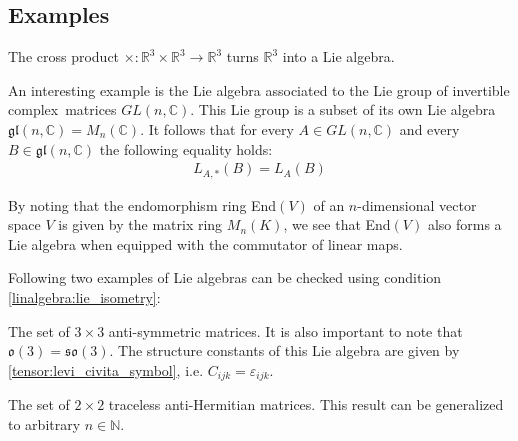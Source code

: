 \subsection{Examples}

        \begin{example}
        	The cross product $\times:\mathbb{R}^3\times\mathbb{R}^3\rightarrow\mathbb{R}^3$ turns $\mathbb{R}^3$ into a Lie algebra.
        \end{example}
        \begin{example}
        	An interesting example is the Lie algebra associated to the Lie group of invertible complex\footnotemark\ matrices $GL(n, \mathbb{C})$. This Lie group is a subset of its own Lie algebra $\mathfrak{gl}(n, \mathbb{C}) = M_n(\mathbb{C})$. It follows that for every $A\in GL(n, \mathbb{C})$ and every $B\in\mathfrak{gl}(n, \mathbb{C})$ the following equality holds:
        	\begin{gather}
        		L_{A,\ast}(B) = L_A(B)
        	\end{gather}
        \end{example}
        \begin{result}\label{lie:end_as_lie_algebra}
        	By noting that the endomorphism ring End$(V)$ of an $n$-dimensional vector space $V$ is given by the matrix ring $M_n(K)$, we see that End$(V)$ also forms a Lie algebra when equipped with the commutator of linear maps.
        \end{result}
        
        Following two examples of Lie algebras can be checked using condition \ref{linalgebra:lie_isometry}:
        \begin{example}
        	The set of $3\times3$ anti-symmetric matrices. It is also important to note that $\mathfrak{o}(3) = \mathfrak{so}(3)$. The structure constants of this Lie algebra are given by \ref{tensor:levi_civita_symbol}, i.e. $C_{ijk} = \varepsilon_{ijk}$.
        \end{example}
        \begin{example}
        	The set of $2\times2$ traceless anti-Hermitian matrices. This result can be generalized to arbitrary $n\in\mathbb{N}$.
        \end{example}
        
